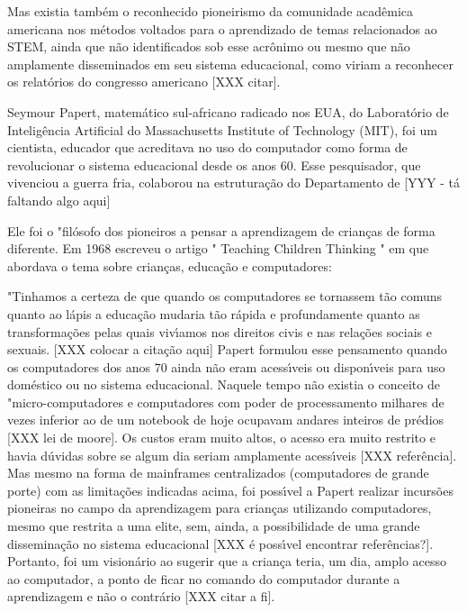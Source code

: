 \documentclass[
12pt,		%
openright,	%
twoside,  %
a4paper,			%
chapter=TITLE,		%
english,			%
french,				%
spanish,			%
brazil				%
]{USPSC-classe/USPSC}
\begin{document}
Mas existia tamb\'em o reconhecido pioneirismo da comunidade acad\^emica americana nos m\'etodos voltados para o aprendizado de temas relacionados ao STEM, ainda que n\~ao identificados sob esse acr\^onimo ou mesmo que n\~ao amplamente disseminados em seu sistema educacional, como viriam a reconhecer os relat\'orios do congresso americano [XXX citar]. 




Seymour Papert, matem\'atico sul-africano radicado nos EUA, do Laborat\'orio de Intelig\^encia Artificial do Massachusetts Institute of Technology (MIT), foi um  cientista, educador que acreditava  no  uso do computador como forma de revolucionar o sistema  educacional  desde os anos 60. Esse pesquisador, que vivenciou a guerra fria, colaborou na estrutura\c{c}\~ao do Departamento de  [YYY - t\'a faltando algo aqui]




Ele foi o "fil\'osofo dos pioneiros a pensar a aprendizagem de crian\c{c}as de forma diferente. Em 1968 escreveu o artigo " Teaching Children Thinking "  em que abordava  o tema sobre crian\c{c}as, educa\c{c}\~ao e computadores: 




"Tinhamos  a certeza de que quando os computadores se tornassem t\~ao comuns quanto ao l\'apis a educa\c{c}\~ao mudaria t\~ao r\'apida e profundamente quanto as transforma\c{c}\~oes pelas quais viv\'{\i}amos nos direitos civis e nas rela\c{c}\~oes sociais e sexuais. [XXX colocar a cita\c{c}\~ao aqui]
Papert formulou esse pensamento quando os computadores dos anos 70 ainda n\~ao eram acess\'{\i}veis ou dispon\'{\i}veis para uso dom\'estico ou no sistema educacional. Naquele tempo n\~ao existia o conceito de "micro-computadores e computadores com poder de processamento milhares de vezes inferior ao de um notebook de hoje ocupavam andares inteiros de pr\'edios [XXX lei de moore]. Os custos eram muito altos, o acesso era muito restrito e havia d\'uvidas sobre se algum dia seriam amplamente acess\'{\i}veis [XXX refer\^encia]. Mas mesmo na forma de mainframes centralizados (computadores de grande porte) com as limita\c{c}\~oes indicadas acima, foi poss\'{\i}vel a Papert realizar incurs\~oes pioneiras no campo da aprendizagem para crian\c{c}as utilizando computadores, mesmo que restrita a uma elite, sem, ainda, a possibilidade de uma grande dissemina\c{c}\~ao no sistema educacional [XXX \'e poss\'{\i}vel encontrar refer\^encias?].  Portanto, foi um vision\'ario ao sugerir que a crian\c{c}a teria, um dia, amplo acesso ao computador, a ponto de ficar no comando do computador durante a aprendizagem e n\~ao o contr\'ario [XXX citar a fi]. 
\end{document}
